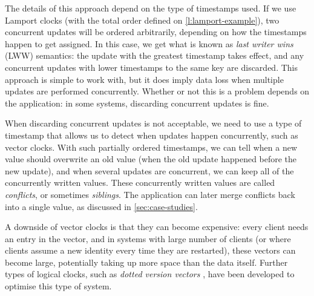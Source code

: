 The details of this approach depend on the type of timestamps used.
If we use Lamport clocks (with the total order defined on \autoref{l:lamport-example}), two concurrent updates will be ordered arbitrarily, depending on how the timestamps happen to get assigned.
In this case, we get what is known as \emph{last writer wins} (LWW) semantics: the update with the greatest timestamp takes effect, and any concurrent updates with lower timestamps to the same key are discarded.
This approach is simple to work with, but it does imply data loss when multiple updates are performed concurrently.
Whether or not this is a problem depends on the application: in some systems, discarding concurrent updates is fine.

When discarding concurrent updates is not acceptable, we need to use a type of timestamp that allows us to detect when updates happen concurrently, such as vector clocks.
With such partially ordered timestamps, we can tell when a new value should overwrite an old value (when the old update happened before the new update), and when several updates are concurrent, we can keep all of the concurrently written values.
These concurrently written values are called \emph{conflicts}, or sometimes \emph{siblings}.
The application can later merge conflicts back into a single value, as discussed in \autoref{sec:case-studies}.

A downside of vector clocks is that they can become expensive: every client needs an entry in the vector, and in systems with large number of clients (or where clients assume a new identity every time they are restarted), these vectors can become large, potentially taking up more space than the data itself.
Further types of logical clocks, such as \emph{dotted version vectors} \citep{Preguica:2010}, have been developed to optimise this type of system.

